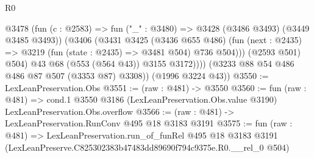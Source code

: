 \begin{lexlean}{R0}
\begin{coremodule}
                @3478
                  (fun (c : @2583) => fun ("_" : @3480) => @3428 (@3486 @3493) (@3449 @3485 @3493))
                  (@3406
                    (@3431
                      @3425
                      (@3436 @655 @486)
                      (fun (next : @2435) => @3219 (fun (state : @2435) => @3481 @504) @736 @504)))
                  (@2593 @501)
                  @504)
                @43
                @68
                (@553 (@564 @43))
                @3155
                @3172))))
        (@3233 @88 @54 @486 @486 @87 @507 (@3353 @87) @3308))
      (@1996 @3224 @43))
@3550 := LexLeanPreservation.Obs
@3551 := (raw : @481) -> @3550
@3560 := fun (raw : @481) =>
  cond.{1} @3550 @3186 (LexLeanPreservation.Obs.value @3190) LexLeanPreservation.Obs.overflow
@3566 := (raw : @481) -> LexLeanPreservation.RunConv @495 @18 @3183 @3191
@3575 := fun (raw : @481) =>
  LexLeanPreservation.run_of_funRel
    @495
    @18
    @3183
    @3191
    (LexLeanPreserve.C825302383b47483dd89690f794c9375e.R0.__rel_0 @504)
\end{coremodule}
\end{lexlean}
